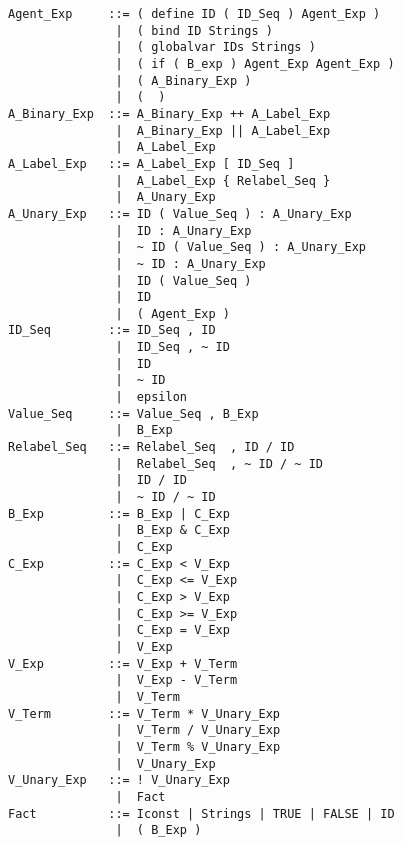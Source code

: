 \footnotesize
  \begin{verbatim}
Agent_Exp     ::= ( define ID ( ID_Seq ) Agent_Exp )
               |  ( bind ID Strings )
               |  ( globalvar IDs Strings )
               |  ( if ( B_exp ) Agent_Exp Agent_Exp )
               |  ( A_Binary_Exp )
               |  (  )
A_Binary_Exp  ::= A_Binary_Exp ++ A_Label_Exp
               |  A_Binary_Exp || A_Label_Exp
               |  A_Label_Exp
A_Label_Exp   ::= A_Label_Exp [ ID_Seq ]
               |  A_Label_Exp { Relabel_Seq }
               |  A_Unary_Exp
A_Unary_Exp   ::= ID ( Value_Seq ) : A_Unary_Exp
               |  ID : A_Unary_Exp
               |  ~ ID ( Value_Seq ) : A_Unary_Exp
               |  ~ ID : A_Unary_Exp
               |  ID ( Value_Seq )
               |  ID
               |  ( Agent_Exp )
ID_Seq        ::= ID_Seq , ID
               |  ID_Seq , ~ ID
               |  ID
               |  ~ ID
               |  epsilon
Value_Seq     ::= Value_Seq , B_Exp
               |  B_Exp
Relabel_Seq   ::= Relabel_Seq  , ID / ID
               |  Relabel_Seq  , ~ ID / ~ ID
               |  ID / ID
               |  ~ ID / ~ ID
B_Exp         ::= B_Exp | C_Exp
               |  B_Exp & C_Exp
               |  C_Exp
C_Exp         ::= C_Exp < V_Exp
               |  C_Exp <= V_Exp
               |  C_Exp > V_Exp
               |  C_Exp >= V_Exp
               |  C_Exp = V_Exp
               |  V_Exp
V_Exp         ::= V_Exp + V_Term
               |  V_Exp - V_Term
               |  V_Term
V_Term        ::= V_Term * V_Unary_Exp
               |  V_Term / V_Unary_Exp
               |  V_Term % V_Unary_Exp
               |  V_Unary_Exp
V_Unary_Exp   ::= ! V_Unary_Exp
               |  Fact
Fact          ::= Iconst | Strings | TRUE | FALSE | ID
               |  ( B_Exp )
  \end{verbatim}
